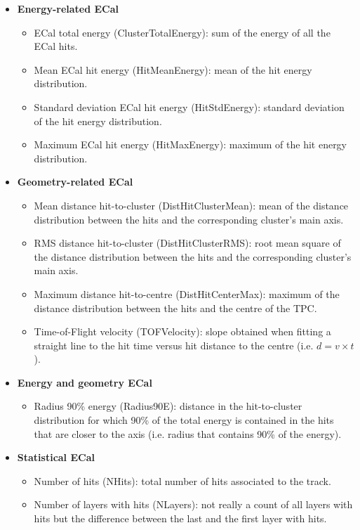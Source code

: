 \begin{itemize}
	\item \textbf{Energy-related ECal}
	\begin{itemize}
		\item ECal total energy (ClusterTotalEnergy): sum of the energy of all the ECal hits.
		\item Mean ECal hit energy (HitMeanEnergy): mean of the hit energy distribution.
		\item Standard deviation ECal hit energy (HitStdEnergy): standard deviation of the hit energy distribution.
		\item Maximum ECal hit energy (HitMaxEnergy): maximum of the hit energy distribution.
	\end{itemize}
	\item \textbf{Geometry-related ECal}
	\begin{itemize}
		\item Mean distance hit-to-cluster (DistHitClusterMean): mean of the distance distribution between the hits and the corresponding cluster's main axis.
		\item RMS distance hit-to-cluster (DistHitClusterRMS): root mean square of the distance distribution between the hits and the corresponding cluster's main axis.
		\item Maximum distance hit-to-centre (DistHitCenterMax): maximum of the distance distribution between the hits and the centre of the TPC.
		\item Time-of-Flight velocity (TOFVelocity): slope obtained when fitting a straight line to the hit time versus hit distance to the centre (i.e. $d = v \times t$).
	\end{itemize}
	\item \textbf{Energy and geometry ECal}
	\begin{itemize}
		\item Radius 90\% energy (Radius90E): distance in the hit-to-cluster distribution for which 90\% of the total energy is contained in the hits that are closer to the axis (i.e. radius that contains 90\% of the energy).
	\end{itemize}
	\item \textbf{Statistical ECal}
	\begin{itemize}
		\item Number of hits (NHits): total number of hits associated to the track.
		\item Number of layers with hits (NLayers): not really a count of all layers with hits but the difference between the last and the first layer with hits.
	\end{itemize}
\end{itemize}

